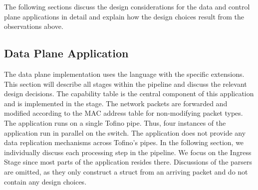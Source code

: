 %

The following sections discuss the design considerations for the data and control plane applications in detail and explain how the design choices result from the observations above.

\subsection{Data Plane Application}
The data plane implementation uses the \langpfour{} language with the \tofino{} specific extensions. This section will describe all stages within the pipeline and discuss the relevant design decisions. The capability table is the central component of this application and is implemented in the  stage. The network packets are forwarded and modified according to the \ac{MAC} address table for non-modifying packet types. The application runs on a single Tofino pipe. Thus, four instances of the application run in parallel on the switch. The application does not provide any data replication mechanisms across Tofino's pipes. In the following section, we individually discuss each processing step in the pipeline. We focus on the Ingress Stage since most parts of the application resides there. Discussions of the parsers are omitted, as they only construct a struct from an arriving packet and do not contain any design choices.

